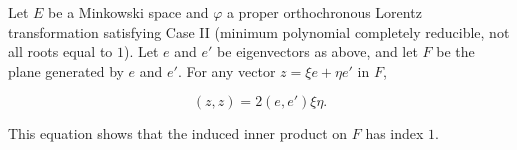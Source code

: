 Let $E$ be a Minkowski space and $\varphi$ a proper orthochronous Lorentz transformation satisfying Case II (minimum polynomial completely reducible, not all roots equal to $1$). Let $e$ and $e'$ be eigenvectors as above, and let $F$ be the plane generated by $e$ and $e'$. For any vector $z = \xi e + \eta e'$ in $F$,

$$(z, z) = 2(e, e') \xi \eta.$$

This equation shows that the induced inner product on $F$ has index $1$.
